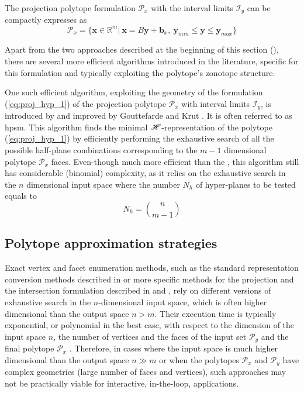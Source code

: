 The projection polytope formulation $\mathcal{P}_x$ with the interval limits $\mathcal{I}_y$ can be compactly expresses as
\begin{equation}
    \mathcal{P}_x=\{\bm{x}\in\mathbb{R}^m |~ \bm{x} = B\bm{y} + \bm{b}_x,~\bm{y}_{min} \leq  \bm{y} \leq \bm{y}_{max}  \}
    \label{eq:proj_hyp_1}
\end{equation}

Apart from the two approaches described at the beginning of this section (), there are several more efficient algorithms introduced in the literature, specific for this formulation and typically exploiting the polytope's zonotope structure.

One such  efficient algorithm, exploiting the geometry of the formulation (\ref{eq:proj_hyp_1}) of the projection polytope $\mathcal{P}_x$ with interval limits $\mathcal{I}_y$, is introduced by \citet{Bouchard2009} and improved by Gouttefarde and Krut \cite{hyper_psm}. It is often referred to as \gls{hpsm}. This algorithm finds the minimal $\mathscr{H}$-representation of the polytope (\ref{eq:proj_hyp_1}) by efficiently performing the exhaustive search of all the possible half-plane combinations corresponding to the $m-1$ dimensional polytope $\mathcal{P}_x$ faces. Even-though much more efficient than the , this algorithm still has considerable (binomial) complexity, as it relies on the exhaustive search in the $n$ dimensional input space where the number $N_h$ of hyper-planes to be tested equals to 
$$N_h = \binom{n}{m-1}$$

\subsection{Polytope approximation strategies}
\label{ch:approximation_algos}

Exact vertex and facet enumeration methods, such as the standard representation conversion methods described in  or more specific methods for the projection and the intersection formulation described in  and , rely on different versions of exhaustive search in the $n$-dimensional input space, which is often higher dimensional than the output space $n> m$. Their execution time is typically exponential, or polynomial in the best case, with respect to the dimension of the input space $n$, the number of vertices and the faces of the input set $\mathcal{P}_y$ and the final polytope $\mathcal{P}_x$ \cite{Dyer1983}. Therefore, in cases where the input space is much higher dimensional than the output space $n\gg m$ or when the polytopes $\mathcal{P}_x$ and $\mathcal{P}_y$ have complex geometries (large number of faces and vertices), such approaches may not be practically viable for interactive, in-the-loop, applications. 

